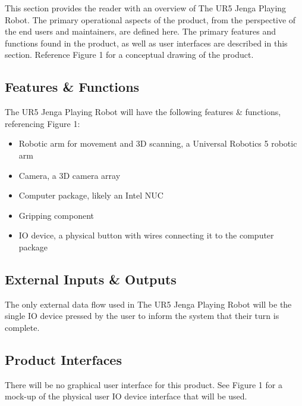 This section provides the reader with an overview of The UR5 Jenga Playing Robot. The primary operational aspects of the product, from the perspective of the end users and maintainers, are defined here. The primary features and functions found in the product, as well as user interfaces are described in this section. Reference Figure 1 for a conceptual drawing of the product. 


\subsection{Features \& Functions}
The UR5 Jenga Playing Robot will have the following features \& functions, referencing Figure 1:
\begin{itemize}
    \item Robotic arm for movement and 3D scanning, a Universal Robotics 5 robotic arm
    \item Camera, a 3D camera array
    \item Computer package, likely an Intel NUC
    \item Gripping component
    \item IO device, a physical button with wires connecting it to the computer package
\end{itemize}

\subsection{External Inputs \& Outputs}
The only external data flow used in The UR5 Jenga Playing Robot will be the single IO device pressed by the user to inform the system that their turn is complete.

\subsection{Product Interfaces}
There will be no graphical user interface for this product. See Figure 1 for a mock-up of the physical user IO device interface that will be used. 